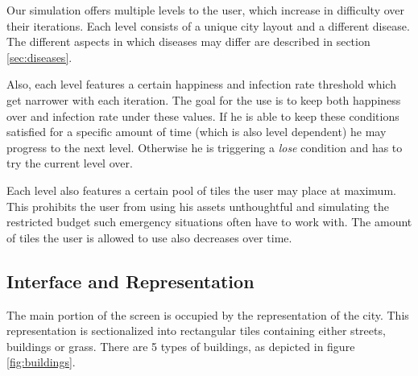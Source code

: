 \documentclass[table]{sig-alternate-05-2015}
\begin{document}
Our simulation offers multiple levels to the user, which increase in difficulty over their iterations. Each level consists of a unique city layout and a different disease. The different aspects in which diseases may differ are described in section \ref{sec:diseases}.

Also, each level features a certain happiness and infection rate threshold which get narrower with each iteration. The goal for the use is to keep both happiness over and infection rate under these values. If he is able to keep these conditions satisfied for a specific amount of time (which is also level dependent) he may progress to the next level. Otherwise he is triggering a \textit{lose} condition and has to try the current level over.

Each level also features a certain pool of tiles the user may place at maximum. This prohibits the user from using his assets unthoughtful and simulating the restricted budget such emergency situations often have to work with. The amount of tiles the user is allowed to use also decreases over time.

\newpage

\subsection{Interface and Representation}


The main portion of the screen is occupied by the representation of the city. This representation is sectionalized into rectangular tiles containing either streets, buildings or grass. There are 5 types of buildings, as depicted in figure \ref{fig:buildings}.
\end{document}
